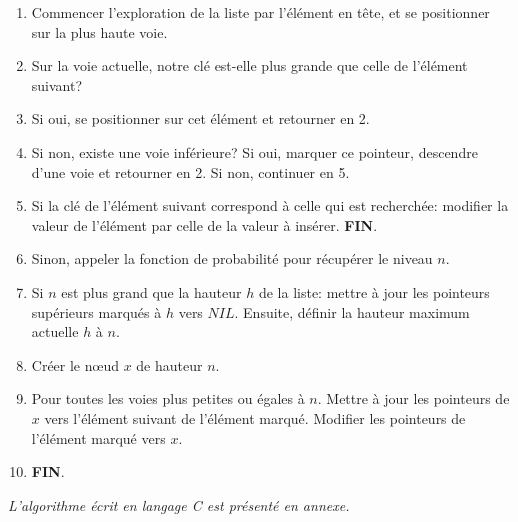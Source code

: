 \documentclass[hidelinks,a4paper, 12pt]{article}
\begin{document}
	\begin{enumerate}
		\item Commencer l'exploration de la liste par l'élément en tête, et se positionner sur la plus haute voie.
		\item Sur la voie actuelle, notre clé est-elle plus grande que celle de l'élément suivant?
		\item Si oui, se positionner sur cet élément et retourner en 2.
		\item Si non, existe une voie inférieure? 
		\subitem Si oui, marquer ce pointeur, descendre d'une voie et retourner en 2.
		\subitem Si non, continuer en 5.
		\subitem 
		\item Si la clé de l'élément suivant correspond à celle qui est recherchée: modifier la valeur de l'élément par celle de la valeur à insérer. \textbf{FIN}.
		\item Sinon, appeler la fonction de probabilité pour récupérer le niveau $n$.
		
		\item Si $n$ est plus grand que la hauteur $h$ de la liste: mettre à jour les pointeurs supérieurs marqués à $h$ vers $NIL$. Ensuite, définir la hauteur maximum actuelle $h$ à $n$.
		\item Créer le nœud $x$ de hauteur $n$.
		
		\item Pour toutes les voies plus petites ou égales à $n$.
		\subitem  Mettre à jour les pointeurs de $x$ vers l'élément suivant de l'élément marqué. Modifier les pointeurs de l'élément marqué vers $x$.
		
		\item \textbf{FIN}.
	\end{enumerate}
	\emph{L'algorithme écrit en langage C est présenté en annexe.}
	
	\newpage
\end{document}
